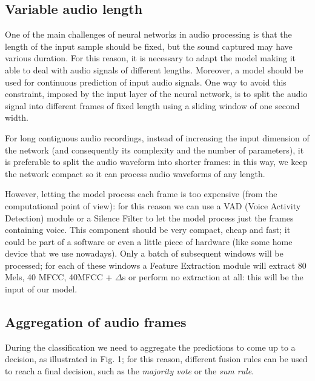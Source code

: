\documentclass[conference]{IEEEtran}
\begin{document}
\subsection{Variable audio length}
One of the main challenges of neural networks in audio processing is that the length of the input sample should be fixed, but the sound captured may have various duration. For this reason, it is necessary to adapt the model making it able to deal with audio signals of different lengths. Moreover, a model should be used for continuous prediction of input audio signals. One way to avoid this constraint, imposed by the input layer of the neural network, is to split the audio signal into different frames of fixed length using a sliding window of one second width.

For long contiguous audio recordings, instead of increasing the input dimension of the network (and consequently its complexity and the number of parameters), it is preferable to split the audio waveform into shorter frames: in this way, we keep the network compact so it can process audio waveforms of any length.

However, letting the model process each frame is too expensive (from the computational point of view): for this reason we can use a VAD (Voice Activity Detection) module or a Silence Filter to let the model process just the frames containing voice. This component should be very compact, cheap and fast; it could be part of a software or even a little piece of hardware (like some home device that we use nowadays).
Only a batch of subsequent windows will be processed; for each of these windows a Feature Extraction module will extract 80 Mels, 40 MFCC, 40MFCC + $\Delta$s or perform no extraction at all: this will be the input of our model.

\subsection{Aggregation of audio frames}
During the classification we need to aggregate the predictions to come up to a decision, as illustrated in Fig. 1; for this reason, different fusion rules can be used to reach a final decision, such as the \textit{majority vote} or the \textit{sum rule}.
\end{document}
